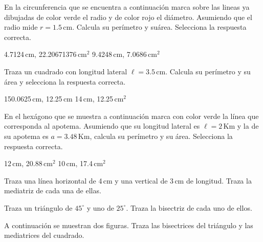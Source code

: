 \documentclass[11pt]{article}
\begin{document}
\vspace{5cm}
En la circunferencia que se encuentra a continuaci\'on marca sobre las lineas ya
dibujadas de color verde el radio y de color rojo el di\'ametro. Asumiendo que
el radio mide $r=1.5$\,cm. Calcula su per\'imetro y su\'area. Selecciona la
respuesta correcta.

\hfill {} 4.7124\,cm, 22.20671376\,cm$^{2}$ \qquad 
{} 9.4248\,cm, 7.0686\,cm$^{2}$



\vspace{1.5cm}
Traza un cuadrado con longitud lateral $\ell=3.5$\,cm. Calcula su per\'imetro y
su \'area y selecciona la respuesta correcta.

\hfill {} 150.0625\,cm, 12.25\,cm \qquad {} 14\,cm, 12.25\,cm$^{2}$

\newpage
En el hex\'agono que se muestra a continuaci\'on marca con color verde la
l\'inea que corresponda al apotema. Asumiendo que su longitud lateral es
$\ell=2$\,Km y la de su apotema es $a=3.48$\,Km, calcula su per\'imetro y su
\'area. Selecciona la respuesta correcta.

\hfill {} 12\,cm, 20.88\,cm$^{2}$ \qquad {} 10\,cm, 17.4\,cm$^{2}$


\vspace{3mm}
Traza una l\'inea horizontal de 4\,cm y una vertical de 3\,cm de longitud. Traza
la mediatriz de cada una de ellas.

\vspace{4cm}
Traza un tri\'angulo de $45^{\circ}$ y uno de $25^{\circ}$. Traza la bisectriz
de cada uno de ellos.

\vspace{4cm}
A continuaci\'on se muestran dos figuras. Traza las bisectrices del tri\'angulo
y las mediatrices del cuadrado.

\vspace{3mm}
\begin{center}
\end{center}
\vspace{3mm}
\end{document}
